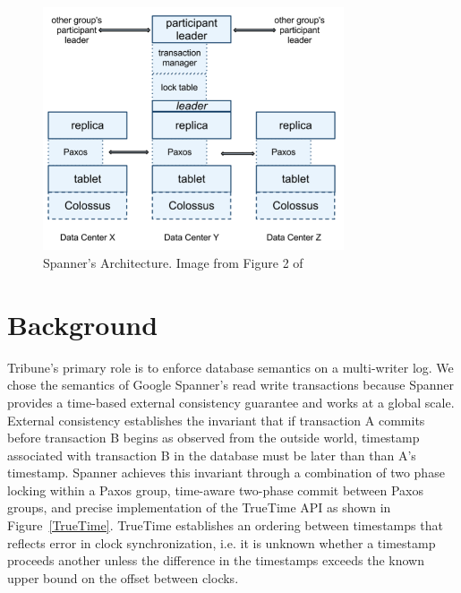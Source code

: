 \documentclass[10pt,twocolumn]{article}
\begin{document}
\begin{figure}[!b]
  \begin{center}
    \includegraphics[width=3.5in]{Images/Spanner_Arch.png}
  \end{center}

  \caption{\small Spanner's Architecture. Image from Figure 2 of \cite{corbett_spanner:_2012} }
  \label{Spanner_Arch}
\end{figure}

\section{Background}

Tribune's primary role is to enforce database semantics on a multi-writer log. We chose the semantics of Google Spanner's read write transactions \cite{corbett_spanner:_2012} because Spanner provides a time-based external consistency guarantee and works at a global scale. External consistency establishes the invariant that if transaction A commits before transaction B begins as observed from the outside world, timestamp associated with transaction B in the database must be later than than A's timestamp. Spanner achieves this invariant through a combination of two phase locking within a Paxos group, time-aware two-phase commit between Paxos groups, and precise implementation of the TrueTime API as shown in Figure~\ref{TrueTime}. TrueTime establishes an ordering between timestamps that reflects error in clock synchronization, i.e. it is unknown whether a timestamp proceeds another unless the difference in the timestamps exceeds the known upper bound on the offset between clocks.
\end{document}
